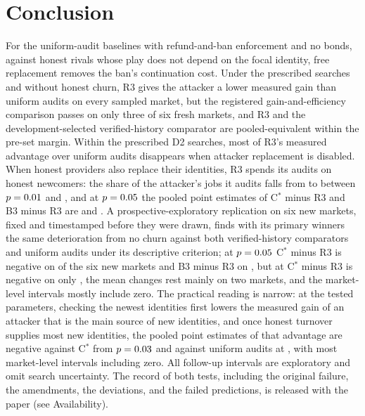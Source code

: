 \documentclass[11pt]{article}
\begin{document}
\section{Conclusion}\label{sec:conclusion}
For the uniform-audit baselines with refund-and-ban enforcement and no bonds, against honest rivals whose play does not depend on the focal identity, free replacement removes the ban's continuation cost. Under the prescribed searches and without honest churn, R3 gives the attacker a lower measured gain than uniform audits on every sampled market, but the registered gain-and-efficiency comparison passes on only three of six fresh markets, and R3 and the development-selected verified-history comparator are pooled-equivalent within the pre-set margin. Within the prescribed D2 searches, most of R3's measured advantage over uniform audits disappears when attacker replacement is disabled. When honest providers also replace their identities, R3 spends its audits on honest newcomers: the share of the attacker's jobs it audits falls from  to  between $p = 0.01$ and , and at $p = 0.05$ the pooled point estimates of C$^*$ minus R3 and B3 minus R3 are  and . A prospective-exploratory replication on six new markets, fixed and timestamped before they were drawn, finds with its primary winners the same deterioration from no churn against both verified-history comparators and uniform audits under its descriptive criterion; at $p = 0.05$ C$^*$ minus R3 is negative on  of the six new markets and B3 minus R3 on , but at  C$^*$ minus R3 is negative on only , the mean changes rest mainly on two markets, and the market-level intervals mostly include zero. The practical reading is narrow: at the tested parameters, checking the newest identities first lowers the measured gain of an attacker that is the main source of new identities, and once honest turnover supplies most new identities, the pooled point estimates of that advantage are negative against C$^*$ from $p = 0.03$ and against uniform audits at , with most market-level intervals including zero. All follow-up intervals are exploratory and omit search uncertainty. The record of both tests, including the original failure, the amendments, the deviations, and the failed predictions, is released with the paper (see Availability).
\end{document}
